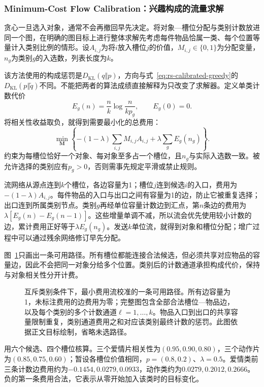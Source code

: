 \subsubsection{Minimum-Cost Flow Calibration：兴趣构成的流量求解}
\label{sec:rs-flow-calibration}

贪心一旦选入对象，通常不会再撤回早先决定。将对象—槽位分配与类别计数放进同一个图，在明确的图目标上进行整体求解先考虑每件物品恰属一类、每个位置等量计入类别比例的情形。设$A_{i,j}$为将$i$放入槽位$j$的价值，$M_{i,j}\in\{0,1\}$为分配变量，$n_g$为类别$g$的入选数，列表长度为$k$。

该方法使用的构成惩罚是$D_{\mathrm{KL}}(q\Vert p)$，方向与式~\eqref{eq:rs-calibrated-greedy}的$D_{\mathrm{KL}}(p\Vert\widetilde q)$不同。不能把两者的算法成绩直接解释为只改变了求解器。定义单类计数代价
\[
 E_g(n)=\frac{n}{k}\log\frac{n}{kp_g},\qquad E_g(0)=0.
\]
将相关性收益取负，就得到需要最小化的总费用：
\begin{equation}
 \min_{\bm M}\left\{
 -(1-\lambda)\sum_{i,j}M_{i,j}A_{i,j}
 +\lambda\sum_g E_g(n_g)\right\}.
 \label{eq:rs-flow-objective}
\end{equation}
约束为每槽位恰好一个对象、每对象至多占一个槽位，且$n_g$与实际入选数一致。被允许选择的类别应有$p_g>0$，否则需事先规定平滑或禁止规则。

流网络从源点连到$k$个槽位，各边容量为1；槽位$j$连到候选$i$的入口，费用为$-(1-\lambda)A_{i,j}$。每件物品的入口与出口之间有容量为1的边，防止它被重复选择；出口连到所属类别节点。类别$g$再经单位容量计数边到汇点，第$n$条边的费用为$\lambda[E_g(n)-E_g(n-1)]$。这些增量单调不减，所以流会优先使用较小计数的边，累计费用正好等于$\lambda E_g(n_g)$。发送$k$单位流，就得到对象和槽位分配；增广过程中可以通过残余网络修订早先分配。

图~\ref{fig:rs-calibration-flow}只画出一条可用路径。所有槽位都能连接合法候选，但必须共享对应物品的容量边，因此不会把同一对象分给多个位置。类别后的计数通道承担构成代价，保持与对象相关性分开计费。

\begin{figure}[htbp]
 \centering
 
 \caption{互斥类别条件下，最小费用流校准的一条可用路径。所有边容量为1，未标注费用的边费用为零；完整图包含全部合法槽位—物品边，以及每个类别的多个计数通道$\ell=1,\ldots,k$。物品入口到出口的共享容量限制重复，类别通道费用之和对应该类别最终计数的惩罚。此图依据正文目标绘制，省略未选路径。}
 \label{fig:rs-calibration-flow}
\end{figure}

用六个候选、四个槽位核算。三个爱情片相关性为$(0.95,0.90,0.80)$，三个动作片为$(0.85,0.75,0.60)$；暂设各槽位价值相同，$p=(0.8,0.2)$、$\lambda=0.5$。爱情类前三条计数边费用约为$-0.1454,0.0279,0.0933$，动作类约为$0.0279,0.2012,0.2666$。负的第一条费用合法，它表示从零开始加入该类时的目标变化。

